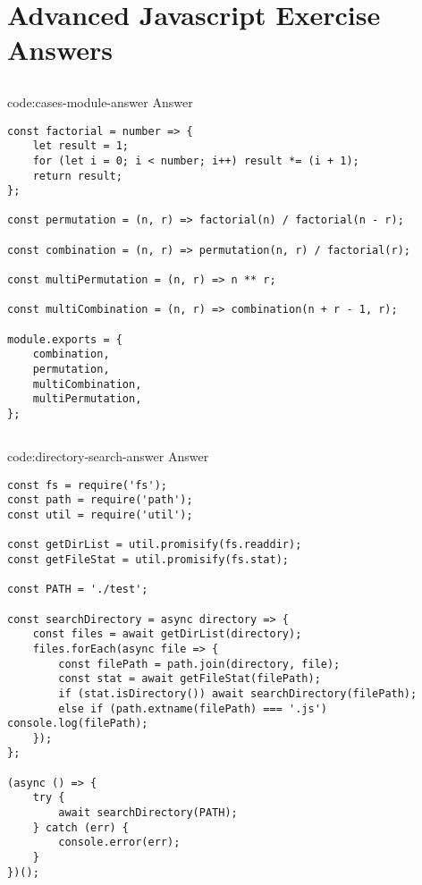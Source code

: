 \section{Advanced Javascript Exercise Answers}\label{sect:advanced-javascript-answers}

\subsection*{}

\begin{codeenv}{code:cases-module-answer}{ Answer}\begin{verbatim}
const factorial = number => {
    let result = 1;
    for (let i = 0; i < number; i++) result *= (i + 1);
    return result;
};

const permutation = (n, r) => factorial(n) / factorial(n - r);

const combination = (n, r) => permutation(n, r) / factorial(r);

const multiPermutation = (n, r) => n ** r;

const multiCombination = (n, r) => combination(n + r - 1, r);

module.exports = {
    combination,
    permutation,
    multiCombination,
    multiPermutation,
};
\end{verbatim}
\end{codeenv}

\subsection*{}

\begin{codeenv}{code:directory-search-answer}{ Answer}\begin{verbatim}
const fs = require('fs');
const path = require('path');
const util = require('util');

const getDirList = util.promisify(fs.readdir);
const getFileStat = util.promisify(fs.stat);

const PATH = './test';

const searchDirectory = async directory => {
    const files = await getDirList(directory);
    files.forEach(async file => {
        const filePath = path.join(directory, file);
        const stat = await getFileStat(filePath);
        if (stat.isDirectory()) await searchDirectory(filePath);
        else if (path.extname(filePath) === '.js') console.log(filePath);
    });
};

(async () => {
    try {
        await searchDirectory(PATH);
    } catch (err) {
        console.error(err);
    }
})();
\end{verbatim}
\end{codeenv}
